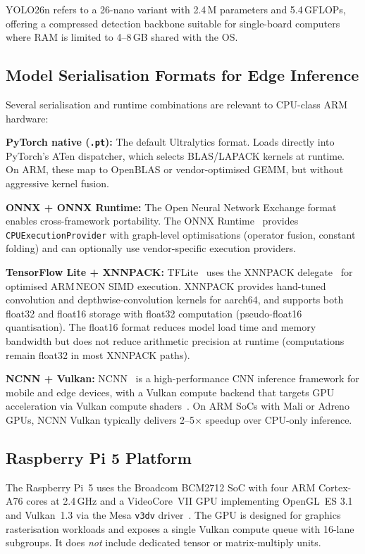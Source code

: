 \documentclass[conference]{IEEEtran}
\begin{document}
YOLO26n refers to a 26-nano variant with 2.4\,M parameters and 5.4\,GFLOPs,
offering a compressed detection backbone suitable for single-board computers
where RAM is limited to 4--8\,GB shared with the OS.

\subsection{Model Serialisation Formats for Edge Inference}

Several serialisation and runtime combinations are relevant to CPU-class ARM
hardware:

\textbf{PyTorch native (\texttt{.pt}):} The default Ultralytics format. Loads
directly into PyTorch's ATen dispatcher, which selects BLAS/LAPACK kernels at
runtime. On ARM, these map to OpenBLAS or vendor-optimised GEMM, but without
aggressive kernel fusion.

\textbf{ONNX + ONNX Runtime:} The Open Neural Network Exchange format
enables cross-framework portability. The ONNX Runtime~\cite{onnxruntime} provides
\texttt{CPUExecutionProvider} with graph-level optimisations (operator fusion,
constant folding) and can optionally use vendor-specific execution providers.

\textbf{TensorFlow Lite + XNNPACK:} TFLite~\cite{david2021tflite} uses the
XNNPACK delegate~\cite{xnnpack} for optimised ARM\,NEON SIMD execution.
XNNPACK provides hand-tuned convolution and depthwise-convolution kernels for
aarch64, and supports both float32 and float16 storage with float32 computation
(pseudo-float16 quantisation). The float16 format reduces model load time and
memory bandwidth but does not reduce arithmetic precision at runtime (computations
remain float32 in most XNNPACK paths).

\textbf{NCNN + Vulkan:} NCNN~\cite{ncnn2023} is a high-performance CNN
inference framework for mobile and edge devices, with a Vulkan compute backend that
targets GPU acceleration via Vulkan compute shaders~\cite{vulkan2023}. On ARM SoCs
with Mali or Adreno GPUs, NCNN Vulkan typically delivers 2--5$\times$ speedup
over CPU-only inference.

\subsection{Raspberry Pi 5 Platform}

The Raspberry Pi~5 uses the Broadcom BCM2712 SoC with four ARM Cortex-A76 cores
at 2.4\,GHz and a VideoCore~VII GPU implementing OpenGL~ES 3.1 and Vulkan~1.3
via the Mesa \texttt{v3dv} driver~\cite{mesa2024v3dv}. The GPU is designed for
graphics rasterisation workloads and exposes a single Vulkan compute queue with
16-lane subgroups. It does \emph{not} include dedicated tensor or matrix-multiply
units.
\end{document}
